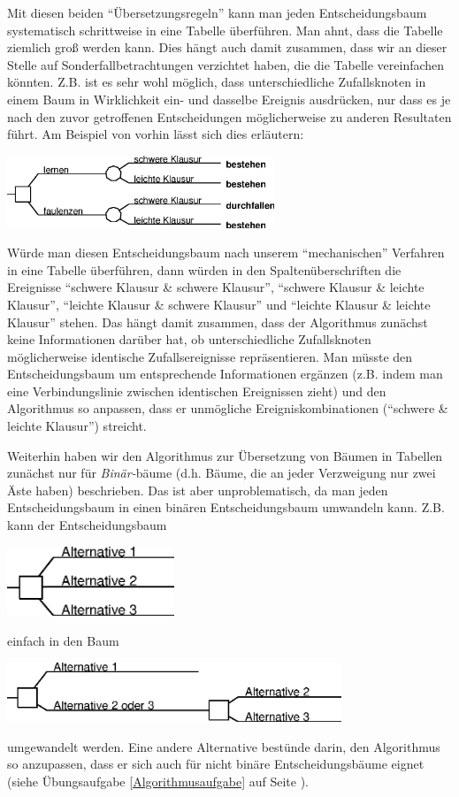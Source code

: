 Mit diesen beiden "`Übersetzungsregeln"' kann man jeden Entscheidungsbaum
systematisch schrittweise in eine Tabelle überführen. Man ahnt, dass die
Tabelle ziemlich groß werden kann. Dies hängt auch damit zusammen, dass wir an
dieser Stelle auf Sonderfallbetrachtungen verzichtet haben, die die Tabelle
vereinfachen könnten. Z.B. ist es sehr wohl möglich, dass unterschiedliche
Zufallsknoten in einem Baum in Wirklichkeit ein- und dasselbe Ereignis
ausdrücken, nur dass es je nach den zuvor getroffenen Entscheidungen
möglicherweise zu anderen Resultaten führt. Am Beispiel von vorhin lässt sich
dies erläutern:
\begin{center}
\includegraphics[width=8cm]{Grafiken/Beispiel1_1.eps}
\end{center}
Würde man diesen Entscheidungsbaum nach unserem "`mechanischen"' Verfahren in
eine Tabelle überführen, dann würden in den Spaltenüberschriften die Ereignisse
"`schwere Klausur \& schwere Klausur"', "`schwere Klausur \& leichte Klausur"',
"`leichte Klausur \& schwere Klausur"' und "`leichte Klausur \& leichte
Klausur"' stehen. Das hängt damit zusammen, dass der Algorithmus zunächst keine
Informationen darüber hat, ob unterschiedliche Zufallsknoten möglicherweise
identische Zufallsereignisse repräsentieren. Man müsste den
Entscheidungsbaum um entsprechende Informationen ergänzen (z.B. indem man eine
Verbindungslinie zwischen identischen Ereignissen zieht) und den Algorithmus so
anpassen, dass er unmögliche Ereigniskombinationen ("`schwere \& leichte
Klausur"') streicht. 

Weiterhin haben wir den Algorithmus zur Übersetzung von Bäumen in Tabellen
zunächst nur für {\em Binär-}bäume (d.h. Bäume, die an jeder Verzweigung nur
zwei Äste haben) beschrieben. Das ist aber unproblematisch, da man jeden
Entscheidungsbaum in einen binären Entscheidungsbaum umwandeln kann. Z.B. kann
der Entscheidungsbaum
\begin{center}
\includegraphics[width=5cm]{Grafiken/Beispiel1b_5.eps}
\end{center}
einfach in den Baum
\begin{center}
\includegraphics[width=10cm]{Grafiken/Beispiel1b_6.eps}
\end{center}
umgewandelt werden. Eine andere Alternative bestünde darin, den Algorithmus so
anzupassen, dass er sich auch für nicht binäre Entscheidungsbäume eignet
(siehe  Übungsaufgabe \ref{Algorithmusaufgabe} auf Seite
\pageref{Algorithmusaufgabe}).


